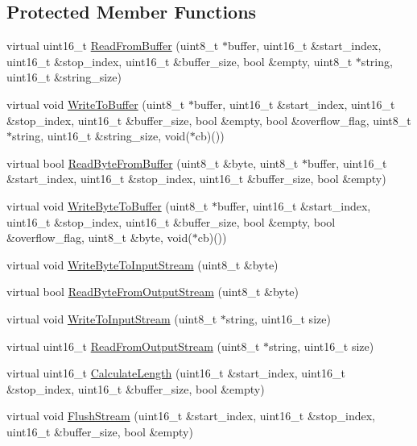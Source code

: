 \subsection*{Protected Member Functions}
\begin{DoxyCompactItemize}
\item 
virtual uint16\-\_\-t \hyperlink{class_stream_a752930f620aed4a3a80b243ce66e57ca}{Read\-From\-Buffer} (uint8\-\_\-t $\ast$buffer, uint16\-\_\-t \&start\-\_\-index, uint16\-\_\-t \&stop\-\_\-index, uint16\-\_\-t \&buffer\-\_\-size, bool \&empty, uint8\-\_\-t $\ast$string, uint16\-\_\-t \&string\-\_\-size)
\item 
virtual void \hyperlink{class_stream_ad4444f4f2a111a304bb0e25efc3a2cb2}{Write\-To\-Buffer} (uint8\-\_\-t $\ast$buffer, uint16\-\_\-t \&start\-\_\-index, uint16\-\_\-t \&stop\-\_\-index, uint16\-\_\-t \&buffer\-\_\-size, bool \&empty, bool \&overflow\-\_\-flag, uint8\-\_\-t $\ast$string, uint16\-\_\-t \&string\-\_\-size, void($\ast$cb)())
\item 
virtual bool \hyperlink{class_stream_a32e449304f65b5571fe848a503fc9d68}{Read\-Byte\-From\-Buffer} (uint8\-\_\-t \&byte, uint8\-\_\-t $\ast$buffer, uint16\-\_\-t \&start\-\_\-index, uint16\-\_\-t \&stop\-\_\-index, uint16\-\_\-t \&buffer\-\_\-size, bool \&empty)
\item 
virtual void \hyperlink{class_stream_a0da4122369b2e625c8e4a224cc598a04}{Write\-Byte\-To\-Buffer} (uint8\-\_\-t $\ast$buffer, uint16\-\_\-t \&start\-\_\-index, uint16\-\_\-t \&stop\-\_\-index, uint16\-\_\-t \&buffer\-\_\-size, bool \&empty, bool \&overflow\-\_\-flag, uint8\-\_\-t \&byte, void($\ast$cb)())
\item 
virtual void \hyperlink{class_stream_a0784d377cc92ddde7cc730be17a1a3aa}{Write\-Byte\-To\-Input\-Stream} (uint8\-\_\-t \&byte)
\item 
virtual bool \hyperlink{class_stream_a3f8e3c5513c6b8605c0fed74a3ed22bc}{Read\-Byte\-From\-Output\-Stream} (uint8\-\_\-t \&byte)
\item 
virtual void \hyperlink{class_stream_aa2f020721d273ce821ccf626e5eb773c}{Write\-To\-Input\-Stream} (uint8\-\_\-t $\ast$string, uint16\-\_\-t size)
\item 
virtual uint16\-\_\-t \hyperlink{class_stream_ab458be72cc54330f518f5ab35ab84106}{Read\-From\-Output\-Stream} (uint8\-\_\-t $\ast$string, uint16\-\_\-t size)
\item 
virtual uint16\-\_\-t \hyperlink{class_stream_a8047b62e7dcfe0e50210b3e40c7aa6eb}{Calculate\-Length} (uint16\-\_\-t \&start\-\_\-index, uint16\-\_\-t \&stop\-\_\-index, uint16\-\_\-t \&buffer\-\_\-size, bool \&empty)
\item 
virtual void \hyperlink{class_stream_a435b1b065846d3b24969cfc6dacabc6b}{Flush\-Stream} (uint16\-\_\-t \&start\-\_\-index, uint16\-\_\-t \&stop\-\_\-index, uint16\-\_\-t \&buffer\-\_\-size, bool \&empty)
\end{DoxyCompactItemize}

